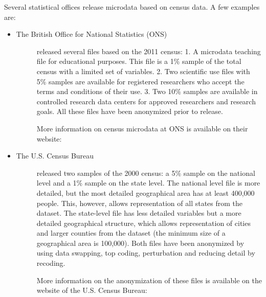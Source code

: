 \documentclass[letterpaper,10pt,english]{sphinxmanual}
\begin{document}
Several statistical offices release microdata based on census data. A
few examples are:
\begin{itemize}
\item {} \begin{description}
\item[{The British Office for National Statistics (ONS)}] \leavevmode
released several files based on the 2011 census:
1. A microdata teaching file for educational purposes. This file is a 1\% sample of the total census with a limited set of variables.
2. Two scientific use files with 5\% samples are available for registered researchers who accept the terms and conditions of their use.
3. Two 10\% samples are available in controlled research data centers for approved researchers and research goals. All these files have been anonymized prior to release. %
\begin{footnote}[23]\sphinxAtStartFootnote
More information on census microdata at ONS is available on their
website:
%
\end{footnote}

\end{description}

\item {} \begin{description}
\item[{The U.S. Census Bureau}] \leavevmode
released two samples of the 2000 census: a 5\% sample on the national level and a 1\% sample on the state level. The
national level file is more detailed, but the most detailed geographical
area has at least 400,000 people. This, however, allows representation
of all states from the dataset. The state-level file has less detailed
variables but a more detailed geographical structure, which allows
representation of cities and larger counties from the dataset (the
minimum size of a geographical area is 100,000).
Both files have been anonymized by using data swapping, top coding, perturbation and reducing
detail by recoding. %
\begin{footnote}[24]\sphinxAtStartFootnote
More information on the anonymization of these files is available on
the website of the U.S. Census Bureau:
%
\end{footnote}

\end{description}

\end{itemize}
\end{document}
